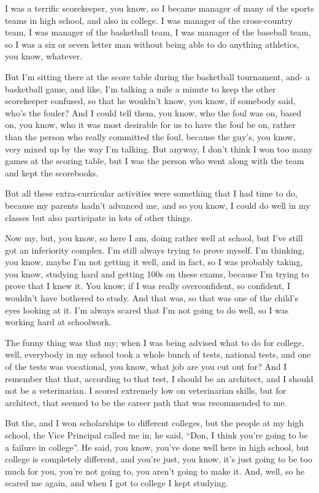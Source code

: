 \documentclass[]{article}
\begin{document}
I was a terrific scorekeeper, you know, so I became manager of many of
the sports teams in high school, and also in college. I was manager of
the cross-country team, I was manager of the basketball team, I was
manager of the baseball team, so I was a six or seven letter man without
being able to do anything athletics, you know, whatever.

But I'm sitting there at the score table during the basketball
tournament, and- a basketball game, and like, I'm talking a mile a
minute to keep the other scorekeeper confused, so that he wouldn't know,
you know, if somebody said, who's the fouler? And I could tell them, you
know, who the foul was on, based on, you know, who it was most desirable
for us to have the foul be on, rather than the person who really
committed the foul, because the guy's, you know, very mixed up by the
way I'm talking. But anyway, I don't think I won too many games at the
scoring table, but I was the person who went along with the team and
kept the scorebooks.

But all these extra-curricular activities were something that I had time
to do, because my parents hadn't advanced me, and so you know, I could
do well in my classes but also participate in lots of other things.

Now my, but, you know, so here I am, doing rather well at school, but
I've still got an inferiority complex. I'm still always trying to prove
myself. I'm thinking, you know, maybe I'm not getting it well, and in
fact, so I was probably taking, you know, studying hard and getting 100s
on these exams, because I'm trying to prove that I knew it. You know; if
I was really overconfident, so confident, I wouldn't have bothered to
study. And that was, so that was one of the child's eyes looking at it.
I'm always scared that I'm not going to do well, so I was working hard
at schoolwork.

The funny thing was that my; when I was being advised what to do for
college, well, everybody in my school took a whole bunch of tests,
national tests, and one of the tests was vocational, you know, what job
are you cut out for? And I remember that that, according to that test, I
should be an architect, and I should not be a veterinarian. I scored
extremely low on veterinarian skills, but for architect, that seemed to
be the career path that was recommended to me.

But the, and I won scholarships to different colleges, but the people at
my high school, the Vice Principal called me in; he said, ``Don, I think
you're going to be a failure in college''. He said, you know, you've
done well here in high school, but college is completely different, and
you're just, you know, it's just going to be too much for you, you're
not going to, you aren't going to make it. And, well, so he scared me
again, and when I got to college I kept studying.
\end{document}
